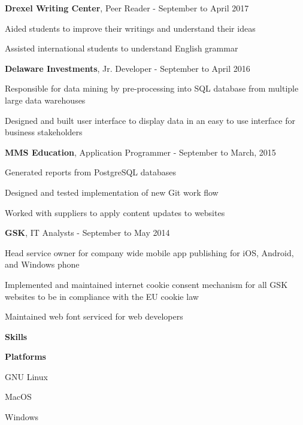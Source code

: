 \documentclass[a4paper,12pt,final]{memoir}
\newcommand{\Sep}{\vspace{1.4em}}
\newcommand{\SmallSep}{\vspace{0.5em}}
\newcommand{\CVSection}[1]
	{\Large\textbf{#1}\par
	\SmallSep\normalsize\normalfont}
\newcommand{\CVItem}[1]
	{\textbf{\color{RoyalBlue} #1}}
\begin{document}
\CVItem{Drexel Writing Center}{, Peer Reader -}{ September to  April 2017}
\begin{compactitem}[\color{RoyalBlue}$\circ$]
    \item Aided students to improve their writings and understand their ideas
    \item Assisted international students to understand English grammar 
\end{compactitem}
\SmallSep

\CVItem{Delaware Investments}{, Jr. Developer -}{ September to  April 2016}
\begin{compactitem}[\color{RoyalBlue}$\circ$]
    \item Responsible for data mining by pre-processing into SQL database from multiple large data warehouses
    \item Designed and built user interface to display data in an easy to use interface for business stakeholders
\end{compactitem}

\SmallSep

\CVItem{MMS Education}{, Application Programmer -}{ September to  March, 2015}
\begin{compactitem}[\color{RoyalBlue}$\circ$]
    \item Generated reports from PostgreSQL databases
    \item Designed and tested implementation of new Git work flow
    \item Worked with suppliers to apply content updates to websites
\end{compactitem}

\SmallSep

\CVItem{GSK}{, IT Analysts -}{ September to May 2014}
\begin{compactitem}[\color{RoyalBlue}$\circ$]
    \item Head service owner for company wide mobile app publishing for iOS, Android, and Windows phone
    \item Implemented and maintained internet cookie consent mechanism for all GSK websites to be in compliance with the EU cookie law
    \item Maintained web font serviced for web developers
\end{compactitem}

\Sep

\CVSection{Skills}
\CVItem{Platforms}
\begin{multicols}{3}
\begin{compactitem}[\color{RoyalBlue}$\circ$]
	\item GNU Linux  
	\item MacOS 
	\item Windows
\end{compactitem}
\end{multicols}
\SmallSep
\end{document}
